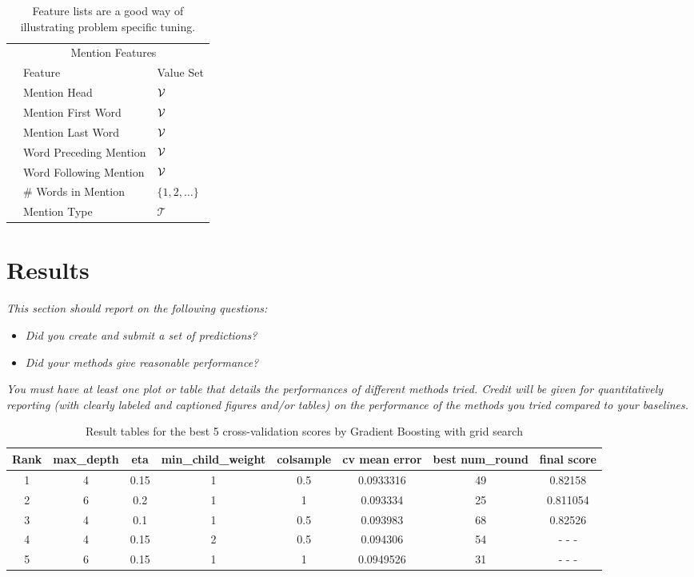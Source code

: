 \documentclass[11pt]{article}
\begin{document}
  \begin{table}
    \centering
    \begin{tabular}{@{}lll@{}}
      &\multicolumn{2}{c}{Mention Features  } \\
      & Feature & Value Set\\
      \midrule
      & Mention Head & $\mathcal{V}$ \\
      & Mention First Word & $\mathcal{V}$ \\
      & Mention Last Word & $\mathcal{V}$ \\
      & Word Preceding Mention & $\mathcal{V}$ \\
      & Word Following Mention & $\mathcal{V}$\\
      & \# Words in Mention & $\{1, 2, \ldots \}$ \\
      & Mention Type & $\mathcal{T}$ \\
      \bottomrule
      
    \end{tabular}
    \caption{Feature lists are a good way of illustrating problem specific tuning.}
  \end{table}



\section{Results}
\textit{This section should report on the following questions: }

\begin{itemize}
\item \textit{Did you create and submit a set of
  predictions? }

\item  \textit{Did your methods give reasonable performance?  }
\end{itemize}

\noindent \textit{You must have \textit{at least one plot or table}
that details the performances of different methods tried. 
Credit will be given for quantitatively reporting (with clearly
labeled and captioned figures and/or tables) on the performance of the
methods you tried compared to your baselines.}

\begin{table}
\centering
\begin{tabular}{cccccccc}
 \toprule
 Rank & max\_depth & eta & min\_child\_weight & colsample & cv mean error & best num\_round & final score\\
 \midrule
  1 & 4 & 0.15 & 1 & 0.5 & 0.0933316 & 49 & 0.82158\\
  2 & 6 & 0.2 & 1 & 1 & 0.093334 & 25 & 0.811054\\
  3 & 4 & 0.1 & 1 & 0.5 & 0.093983 & 68 & 0.82526\\
  4 & 4 & 0.15 & 2 & 0.5 & 0.094306 & 54 & - - -\\
  5 & 6 & 0.15 & 1 & 1 & 0.0949526 & 31 & - - -\\
 \bottomrule
\end{tabular}
\caption{\label{tab:results} Result tables for the best 5 cross-validation scores by Gradient Boosting with grid search}
\end{table}
\end{document}
